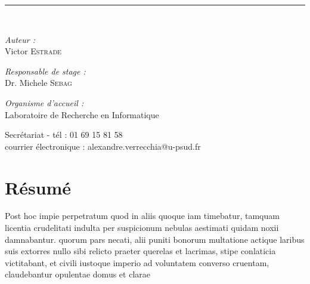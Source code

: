 \documentclass[oneside]{memoir}
\newcommand{\HRule}{\rule{\linewidth}{0.5mm}}
\begin{document}
\begin{titlingpage}
\begin{center}
\HRule \\[1.5cm]
 
\begin{minipage}{0.4\textwidth}
\begin{flushleft} \large
\emph{Auteur :}\\
Victor \textsc{Estrade}
\end{flushleft}
\end{minipage}
\begin{minipage}{0.4\textwidth}
\begin{flushright} \large
\emph{Responsable de stage :} \\
Dr. Michele \textsc{Sebag}
\end{flushright}
\end{minipage}
\vfill
\emph{Organisme d'accueil : }\\
Laboratoire de Recherche en Informatique

 
\vfill


 
{Secrétariat - tél : 01 69 15 81 58\\
courrier électronique : alexandre.verrecchia@u-psud.fr\\
} 
\end{center}
 
\end{titlingpage}



\tableofcontents

\newpage
\thispagestyle{empty}%
\newpage


\chapter*{Résumé}

Post hoc impie perpetratum quod in aliis quoque iam timebatur, tamquam
licentia crudelitati indulta per suspicionum nebulas aestimati quidam
noxii damnabantur. quorum pars necati, alii puniti bonorum multatione
actique laribus suis extorres nullo sibi relicto praeter querelas et
lacrimas, stipe conlaticia victitabant, et civili iustoque imperio ad
voluntatem converso cruentam, claudebantur opulentae domus et
clarae~\cite{Ganin2016}
\end{document}
